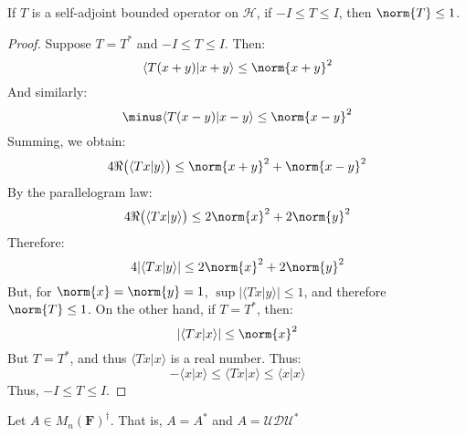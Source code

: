 \documentclass[crop=false,class=book,oneside]{standalone}                      %
\begin{document}
        \begin{theorem}
            If $T$ is a self-adjoint bounded operator on
            $\mathcal{H}$, if $\minus{I}\leq{T}\leq{I}$, then
            $\norm{T}\leq{1}$.
        \end{theorem}
        \begin{proof}
            Suppose $T=T^{*}$ and $\minus{I}\leq{T}\leq{I}$.
            Then:
            \begin{equation}
                \langle{T(x+y)|x+y}\rangle
                \leq\norm{x+y}^{2}
            \end{equation}
            And similarly:
            \begin{equation}
                \minus\langle{T(x-y)|x-y}\rangle
                \leq\norm{x-y}^{2}
            \end{equation}
            Summing, we obtain:
            \begin{equation}
                4\Re\big(\langle{Tx|y}\rangle\big)
                \leq\norm{x+y}^{2}+\norm{x-y}^{2}
            \end{equation}
            By the parallelogram law:
            \begin{equation}
                4\Re\big(\langle{Tx|y}\rangle\big)
                \leq{2}\norm{x}^{2}+2\norm{y}^{2}
            \end{equation}
            Therefore:
            \begin{equation}
                4|\langle{Tx|y}\rangle|
                \leq{2}\norm{x}^{2}+2\norm{y}^{2}
            \end{equation}
            But, for $\norm{x}=\norm{y}=1$,
            $\sup|\langle{Tx|y}\rangle|\leq{1}$, and therefore
            $\norm{T}\leq{1}$. On the other hand, if
            $T=T^{*}$, then:
            \begin{equation}
                |\langle{Tx|x}\rangle|\leq\norm{x}^{2}
            \end{equation}
            But $T=T^{*}$, and thus
            $\langle{Tx|x}\rangle$ is a real number. Thus:
            \begin{equation}
                \minus\langle{x|x}\rangle
                \leq\langle{Tx|x}\rangle
                \leq\langle{x|x}\rangle
            \end{equation}
            Thus, $\minus{I}\leq{T}\leq{I}$.
        \end{proof}
        Let $A\in{M}_{n}(\mathbf{F})^{\dagger}$. That is,
        $A=A^{*}$ and $A=\mathcal{U}\mathcal{D}\mathcal{U}^{*}$
\end{document}
